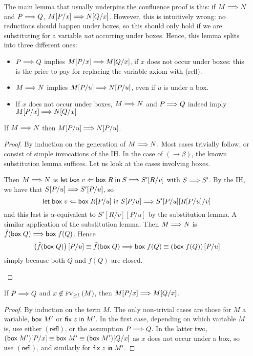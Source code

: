 The main lemma that usually underpins the confluence proof is
this: if $M \mathrel{\Longrightarrow}{} N$ and $P \mathrel{\Longrightarrow}{} Q$, $M[P/x] \mathrel{\Longrightarrow}{} N[Q/x]$.
However, this is intuitively wrong: no reductions should happen
under boxes, so this should only hold if we are substituting for a
variable \emph{not} occurring under boxes.  Hence, this lemma
splits into three different ones:
\begin{itemize}
  \item
    $P \mathrel{\Longrightarrow}{} Q$ implies $M[P/x] \mathrel{\Longrightarrow}{} M[Q/x]$, if $x$ does not
    occur under boxes: this is the price to pay for replacing the
    variable axiom with (\textsf{refl}).
  \item
    $M \mathrel{\Longrightarrow}{} N$ implies $M[P/u] \mathrel{\Longrightarrow}{} N[P/u]$, even if $u$ is
    under a box.
  \item
    If $x$ does not occur under boxes, $M \mathrel{\Longrightarrow}{} N$ and $P
    \mathrel{\Longrightarrow}{} Q$ indeed imply $M[P/x] \mathrel{\Longrightarrow}{} N[Q/x]$
\end{itemize} 
\begin{lem}
  \label{lem:substint}
  If $M \mathrel{\Longrightarrow}{} N$ then $M[P/u] \mathrel{\Longrightarrow}{} N[P/u]$.
\end{lem}
\begin{proof}
  By induction on the generation of $M \mathrel{\Longrightarrow}{} N$. Most cases
  trivially follow, or consist of simple invocations of the IH. In
  the case of $(\rightarrow\beta)$, the known substitution lemma
  suffices. Let us look at the cases involving boxes.
  \begin{indproof}
    \indcase{$\Box\beta$}
      Then $M \mathrel{\Longrightarrow}{} N$ is $\mathsf{let\;box\;} v \Leftarrow \mathsf{box\;}R \mathsf{\;in\;} S \mathrel{\Longrightarrow}{}
      S'[R/v]$ with $S \mathrel{\Longrightarrow}{} S'$. By the IH, we have that
      $S[P/u] \mathrel{\Longrightarrow}{} S'[P/u]$, so \[
	\mathsf{let\;box\;} v \Leftarrow \mathsf{box\;}R[P/u] \mathsf{\;in\;} S[P/u] \mathrel{\Longrightarrow} S'[P/u][R[P/u]/v]
      \] and this last is $\alpha$-equivalent to $S'[R/v][P/u]$ by
      the substitution lemma.
      A similar application of the substitution lemma.
      Then $M \mathrel{\Longrightarrow}{} N$ is $\tilde f(\mathsf{box\;}Q) \mathrel{\Longrightarrow}{}
      \mathsf{box\;}f(Q)$. Hence \[
        \left(\tilde f(\mathsf{box\;}Q)\right)[P/u]
          \equiv
        \tilde f(\mathsf{box\;}Q)
          \mathrel{\Longrightarrow}{}
        \mathsf{box\;}f(Q)
          \equiv
        \left(\mathsf{box\;}f(Q)\right)[P/u]
    \] simply because both $Q$ and $f(Q)$ are closed.
  \end{indproof}
\end{proof}

\begin{lem} 
  \label{lem:substredp}
  If $P \mathrel{\Longrightarrow} Q$ and $x \not\in \textsc{fv}_{\geq 1}\left(M\right)$, then $M[P/x] \mathrel{\Longrightarrow}
  M[Q/x]$.
\end{lem}
\begin{proof}
  By induction on the term $M$. The only non-trivial cases are
  those for $M$ a variable, $\mathsf{box\;}M'$ or $\mathsf{fix\;} z \mathsf{\;in\;} M'$. In
  the first case, depending on which variable $M$ is, use either
  $(\textsf{refl})$, or the assumption $P \mathrel{\Longrightarrow} Q$. In the latter
  two, $(\mathsf{box\;}M')[P/x] \equiv \mathsf{box\;}M' \equiv (\mathsf{box\;}M')[Q/x]$
  as $x$ does not occur under a box, so use $(\textsf{refl})$, and
  similarly for $\mathsf{fix\;} z \mathsf{\;in\;} M'$.
\end{proof}

